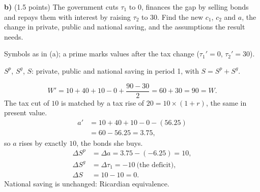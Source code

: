 \textbf{b)} (1.5 points) The government cuts $\tau_1$ to $0$, finances the gap by selling bonds and repays them with interest by raising $\tau_2$ to
$30$. Find the new $c_1$, $c_2$ and $a$, the change in private, public and national saving, and the assumptions the result needs.
\resolespaco
\begin{sol}
\begin{notacao}
\item Symbols as in (a); a prime marks values after the tax change ($\tau_1'=0$, $\tau_2'=30$).
\item $S^p$, $S^g$, $S$: private, public and national saving in period 1, with $S=S^p+S^g$.
\end{notacao}
\[
W'=10+40+10-0+\frac{90-30}{2}=60+30=90=W .
\]
The tax cut of $10$ is matched by a tax rise of $20=10\times(1+r)$, the same in present value.
\begin{align*}
a'&=10+40+10-0-(56.25)\\
&=60-56.25=3.75 ,
\end{align*}
so $a$ rises by exactly $10$, the bonds she buys.
\begin{align*}
\Delta S^p&=\Delta a=3.75-(-6.25)=10,\\
\Delta S^g&=\Delta\tau_1=-10\ \text{(the deficit)},\\
\Delta S&=10-10=0 .
\end{align*}
National saving is unchanged: Ricardian equivalence.
\end{sol}

